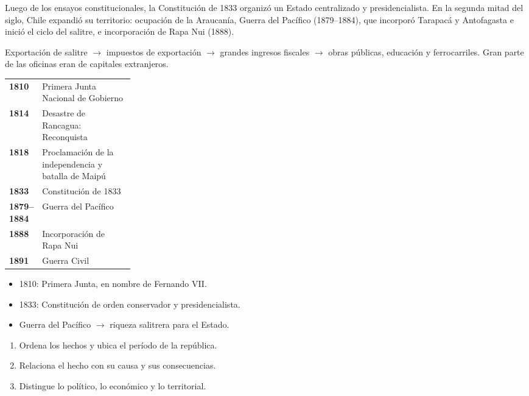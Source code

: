 \documentclass[10pt,a4paper,twocolumn]{article}
\makeatletter
\renewcommand{\arraystretch}{1.18}
\newenvironment{lineatiempo}[1][Línea de tiempo]
  {\begin{tcolorbox}[paes, acento=zinc700, title={#1}]\small\renewcommand{\arraystretch}{1.25}%
   \begin{tabular}{@{}>{\leavevmode\sffamily\bfseries\color{zinc700}}p{0.24\linewidth}p{\dimexpr0.76\linewidth-2\tabcolsep\relax}@{}}}
  {\end{tabular}\end{tcolorbox}}
\makeatother
\begin{document}
Luego de los ensayos constitucionales, la Constitución de 1833 organizó un Estado centralizado y presidencialista. En la segunda mitad del siglo, Chile expandió su territorio: ocupación de la Araucanía, Guerra del Pacífico (1879–1884), que incorporó Tarapacá y Antofagasta e inició el ciclo del salitre, e incorporación de Rapa Nui (1888).

\begin{mecanismo}
Exportación de salitre $\rightarrow$ impuestos de exportación $\rightarrow$ grandes ingresos fiscales $\rightarrow$ obras públicas, educación y ferrocarriles. Gran parte de las oficinas eran de capitales extranjeros.
\end{mecanismo}

\begin{lineatiempo}
1810 & Primera Junta Nacional de Gobierno \\
1814 & Desastre de Rancagua: Reconquista \\
1818 & Proclamación de la independencia y batalla de Maipú \\
1833 & Constitución de 1833 \\
1879–1884 & Guerra del Pacífico \\
1888 & Incorporación de Rapa Nui \\
1891 & Guerra Civil \\
\end{lineatiempo}

\begin{ideasclave}
\begin{itemize}
  \item 1810: Primera Junta, en nombre de Fernando VII.
  \item 1833: Constitución de orden conservador y presidencialista.
  \item Guerra del Pacífico $\rightarrow$ riqueza salitrera para el Estado.
\end{itemize}
\end{ideasclave}

\begin{metodo}
\begin{enumerate}
  \item Ordena los hechos y ubica el período de la república.
  \item Relaciona el hecho con su causa y sus consecuencias.
  \item Distingue lo político, lo económico y lo territorial.
\end{enumerate}
\end{metodo}
\end{document}
